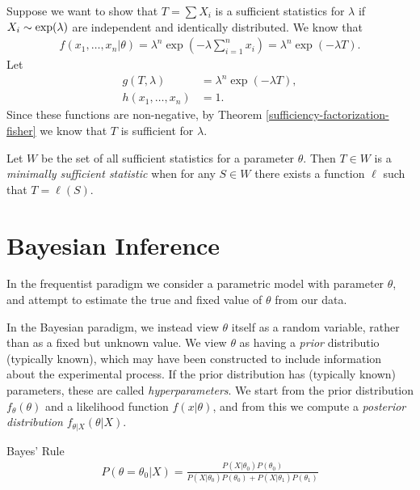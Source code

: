 \begin{exmp}
    Suppose we want to show that $T = \sum X_i$ is a sufficient statistics for $\lambda$ if $X_i \sim \textrm{exp}(\lambda)$ are independent and identically distributed. We know that
    \begin{align*}
        f(x_1, \ldots, x_n|\theta) = \lambda^n\exp\left(-\lambda\sum_{i=1}^{n}x_i\right) = \lambda^n\exp\left(-\lambda T\right).
    \end{align*}
    Let
    \begin{align*}
        g(T,\lambda) &= \lambda^n\exp\left(-\lambda T\right), \\
        h(x_1, \ldots, x_n) &= 1.
    \end{align*}
    Since these functions are non-negative, by Theorem \ref{sufficiency-factorization-fisher} we know that $T$ is sufficient for $\lambda$.
\end{exmp}

\begin{defn}
    Let $W$ be the set of all sufficient statistics for a parameter $\theta$. Then $T \in W$ is a \emph{minimally sufficient statistic} when for any $S \in W$ there exists a function $\ell$ such that $T = \ell(S)$.
\end{defn}

\section{Bayesian Inference}

\begin{rmk}
    In the frequentist paradigm we consider a parametric model with parameter $\theta$, and attempt to estimate the true and fixed value of $\theta$ from our data.

    In the Bayesian paradigm, we instead view $\theta$ itself as a random variable, rather than as a fixed but unknown value. We view $\theta$ as having a \emph{prior} distributio (typically known), which may have been constructed to include information about the experimental process. If the prior distribution has (typically known) parameters, these are called \emph{hyperparameters}. We start from the prior distribution $f_{\theta}(\theta)$ and a likelihood function $f(x|\theta)$, and from this we compute a \emph{posterior distribution} $f_{\theta|X}(\theta|X)$.
\end{rmk}

\begin{defn}{Bayes' Rule}\proofbreak
    \begin{align*}
        P\left(\theta = \theta_0|X\right) = \frac{P\left(X|\theta_0\right)P(\theta_0)}{P\left(X|\theta_0\right)P(\theta_0) + P\left(X|\theta_1\right)P(\theta_1)}
    \end{align*}
\end{defn}

